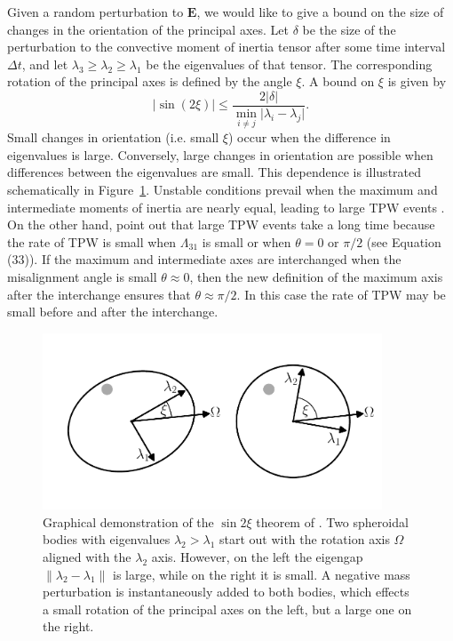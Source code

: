 \documentclass[preprint,12pt,authoryear]{elsarticle}
\begin{document}
Given a random perturbation to $\mathbf{E}$, we would like to give a bound on the size of changes in the orientation of the principal axes. Let $\delta$ be the size of the perturbation to the convective moment of inertia tensor after some time interval $\Delta t$, and let $\lambda_3 \ge \lambda_2 \ge \lambda_1$ be the eigenvalues of that tensor.  The corresponding rotation of the principal axes is defined by the angle $\xi$. A bound on $\xi$ is given by \citep{davis1970rotation}
\begin{equation}
\vert \sin(2 \xi) \vert \le \frac{ 2 \vert \delta \vert}{ \displaystyle \min_{i \neq j} \vert \lambda_i - \lambda_j \vert }.
\label{eq:kahan}
\end{equation} 
Small changes in orientation (i.e. small $\xi$) occur when the difference in eigenvalues is large. Conversely, large changes in orientation are possible when differences between the eigenvalues are small. 
This dependence is illustrated schematically in Figure~\ref{fig:perturb}.  Unstable conditions prevail when the maximum and intermediate moments of inertia are nearly equal, leading to large TPW events \citep{evans1998true}. On the other hand, \citet{tsai2007theoretical} point out that large TPW events take a long time because the rate of TPW is small when $\Lambda_{31}$ is small or when $\theta = 0$ or $\pi/2$ (see Equation (33)). If the maximum and intermediate axes are interchanged when the misalignment angle is small $\theta \approx 0$, then the new definition of the maximum axis after the interchange ensures that $\theta \approx \pi/2$. In this case the rate of TPW may be small before and after the interchange.

\begin{figure}
\centering
\includegraphics[width=0.9\textwidth]{figures/perturb.pdf}
\caption{Graphical demonstration of the $\sin{2 \xi}$ theorem of \citet{davis1970rotation}.  Two spheroidal bodies with eigenvalues $\lambda_2 > \lambda_1$ start out with the rotation axis $\Omega$ aligned with the $\lambda_2$ axis. However, on the left the eigengap $\lVert \lambda_2 - \lambda_1 \rVert$ is large, while on the right it is small.  A negative mass perturbation is instantaneously added to both bodies, which effects a small rotation of the principal axes on the left, but a large one on the right.}
\label{fig:perturb}
\end{figure}
\end{document}
